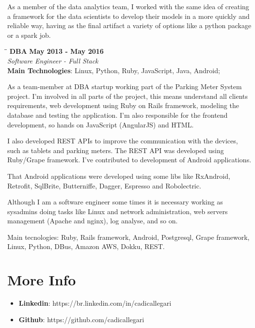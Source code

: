\documentclass[margin]{res}
\begin{document}
\begin{resume}
As a member of the data analytics team, I worked with the same idea of creating a framework for the data scientists to develop their models in a more quickly and reliable way, having as the final artifact a variety of options like a python package or a spark job.


\vspace{-0.1in}
   \begin{tabbing}
   \hspace{2.3in}\= \hspace{1.7in}\= \kill %
    \textbf{DBA}    \>\>\textbf{May 2013 - May 2016}\\
    \textit{Software Engineer - Full Stack}\\
    \textbf{Main Technologies}: Linux, Python, Ruby, JavaScript, Java, Android;
   \end{tabbing}\vspace{-20pt}      %
    \vspace{2mm}
As a team-member at DBA startup working part of the Parking Meter System project. I'm involved in all parts of the project, this means understand all clients requirements, web development using Ruby on Rails framework, modeling the database and testing the application. I'm also responsible for the frontend development, so hands on JavaScript (AngularJS) and HTML.

I also developed REST APIs to improve the communication with the devices, such as tablets and parking meters. The REST API was developed using Ruby/Grape framework. I've contributed to development of Android applications.

That Android applications were developed using some libs like RxAndroid, Retrofit, SqlBrite, Butterniffe, Dagger, Espresso and Robolectric.

Although I am a software engineer some times it is necessary working as sysadmins doing tasks like Linux and network administration, web servers management (Apache and nginx), log analyse, and so on.

Main tecnologies: Ruby, Rails framework, Android, Postgresql, Grape framework, Linux, Python, DBus, Amazon AWS, Dokku, REST.


\section{More Info}
    \begin{itemize}
        \item \textbf{Linkedin}: https://br.linkedin.com/in/cadicallegari
         \item \textbf{Github}: https://github.com/cadicallegari
    \end{itemize}


\end{resume}
\end{document}
